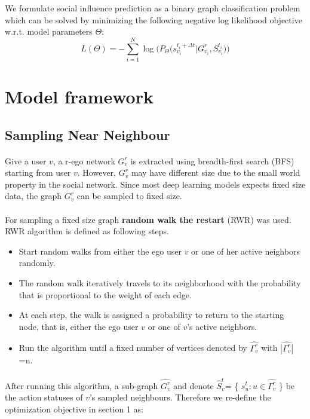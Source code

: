 We formulate social influence prediction as a binary graph classification problem which can be solved by minimizing the following negative log likelihood objective w.r.t. model parameters $\Theta$: $$L(\Theta) = - \sum_{i=1}^N \log \big( P_\Theta \big( s_{v_i}^{t_i+\Delta t} \vert G_{v_i}^r, S_{v_i}^{t_i}\big)\big)$$

\section{Model framework}
\subsection{Sampling Near Neighbour}

\paragraph{} Give a user $v$, a r-ego network $G_v^r$ is extracted using breadth-first search (BFS) starting from 
user $v$. However, $G_v^r$ may have different size due to the small world property in the social network. Since most
deep learning models expects fixed size data, the graph $G_v^r$ can be sampled to fixed size.
\paragraph{} For sampling a fixed size graph \textbf{random walk the restart} (RWR) was used. RWR algorithm is defined as
following steps.

\begin{itemize}
    \item Start random walks from either the ego user $v$ or one of her active neighbors randomly.
    \item The random walk iteratively travels to its neighborhood with the probability that is 
    proportional to the weight of each edge.
    \item At each step, the walk is assigned a probability to return to the starting node, that is, 
    either the ego user $v$ or one of $v$’s active neighbors.
    \item Run the algorithm until a fixed number of vertices denoted by $\hat{\Gamma_v^r}$ with $\hat{|\Gamma_v^r|}$=n. 
\end{itemize}

\paragraph{} After running this algorithm, a sub-graph $\hat{G_v^r}$ and denote $\hat{S}_v^t$=
\{ $s_u^t :u \in \hat{\Gamma_v^r}$ \} be the action statuses of $v$'s sampled neighbours. Therefore we re-define the optimization
objective in section 1 as:


